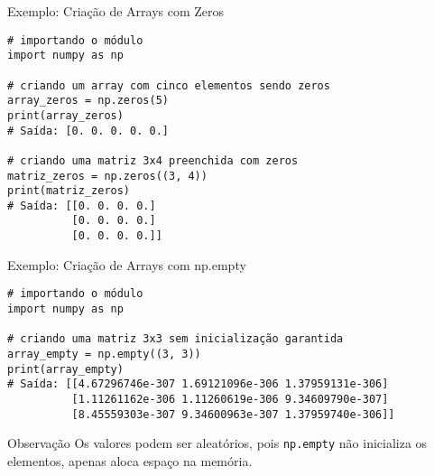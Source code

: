 \begin{frame}[fragile]{Exemplo: Criação de Arrays com Zeros}

\begin{verbatim}
# importando o módulo
import numpy as np

# criando um array com cinco elementos sendo zeros
array_zeros = np.zeros(5)
print(array_zeros)
# Saída: [0. 0. 0. 0. 0.] 

# criando uma matriz 3x4 preenchida com zeros
matriz_zeros = np.zeros((3, 4)) 
print(matriz_zeros)
# Saída: [[0. 0. 0. 0.] 
          [0. 0. 0. 0.] 
          [0. 0. 0. 0.]]
\end{verbatim}

\end{frame}
\begin{frame}[fragile]{Exemplo: Criação de Arrays com np.empty}

\begin{verbatim}
# importando o módulo
import numpy as np

# criando uma matriz 3x3 sem inicialização garantida
array_empty = np.empty((3, 3)) 
print(array_empty)
# Saída: [[4.67296746e-307 1.69121096e-306 1.37959131e-306]
          [1.11261162e-306 1.11260619e-306 9.34609790e-307] 
          [8.45559303e-307 9.34600963e-307 1.37959740e-306]]
\end{verbatim}

\begin{alertblock}{Observação}
Os valores podem ser aleatórios, pois \texttt{np.empty} não inicializa os elementos, apenas aloca espaço na memória.
\end{alertblock}

\end{frame}

